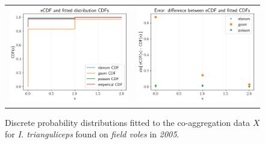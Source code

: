 \documentclass[hidelinks]{article}
\begin{document}
\begin{figure}[]
	\begin{mdframed}[backgroundcolor=grey250,rightline=false,leftline=false,topline=false]
	\centering
	\begin{tabular}{ll}
	\includegraphics[width=.48\linewidth,valign=m]{CDF_compare_2005_I.trianguliceps_FV} & \includegraphics[width=.48\linewidth,valign=m]{CDF_errors_2005_I.trianguliceps_FV}
	\end{tabular}
		\caption{Discrete probability distributions fitted to the co-aggregation data $ X $ for \textit{I. trianguliceps} found on \textit{field voles} in \textit{2005}.}
	\label{fig:CDF_2005_itrianguliceps_FV}
	\end{mdframed}
\end{figure}
\end{document}
